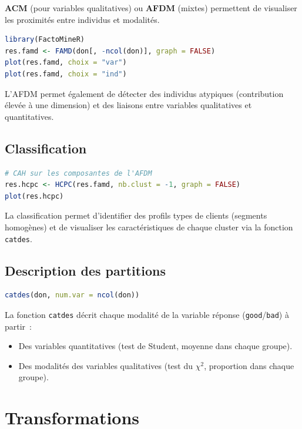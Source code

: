 \documentclass[a4paper,11pt]{article}
\theoremstyle{definition}
\theoremstyle{remark}
\begin{document}
\textbf{ACM} (pour variables qualitatives) ou \textbf{AFDM} (mixtes)
permettent de visualiser les proximités entre individus et modalités.

\begin{lstlisting}[language=R]
library(FactoMineR)
res.famd <- FAMD(don[, -ncol(don)], graph = FALSE)
plot(res.famd, choix = "var")
plot(res.famd, choix = "ind")
\end{lstlisting}

L'AFDM permet également de détecter des individus atypiques
(contribution élevée à une dimension) et des liaisons entre
variables qualitatives et quantitatives.

\subsection{Classification}

\begin{lstlisting}[language=R]
# CAH sur les composantes de l'AFDM
res.hcpc <- HCPC(res.famd, nb.clust = -1, graph = FALSE)
plot(res.hcpc)
\end{lstlisting}

La classification permet d'identifier des profils types de clients
(segments homogènes) et de visualiser les caractéristiques de
chaque cluster via la fonction \texttt{catdes}.

\subsection{Description des partitions}

\begin{lstlisting}[language=R]
catdes(don, num.var = ncol(don))
\end{lstlisting}

La fonction \texttt{catdes} décrit chaque modalité de la variable
réponse (\texttt{good}/\texttt{bad}) à partir~:
\begin{itemize}
  \item Des variables quantitatives (test de Student, moyenne dans
    chaque groupe).
  \item Des modalités des variables qualitatives (test du $\chi^2$,
    proportion dans chaque groupe).
\end{itemize}

\section{Transformations}
\end{document}
